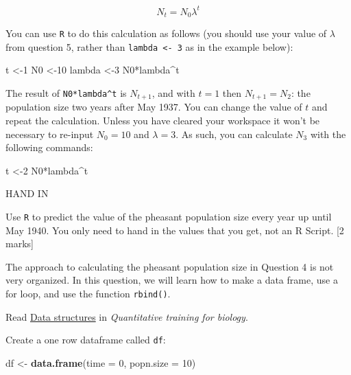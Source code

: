 \documentclass[]{book}
\newenvironment{Shaded}{\begin{snugshade}}{\end{snugshade}}
\newcommand{\KeywordTok}[1]{\textcolor[rgb]{0.13,0.29,0.53}{\textbf{{#1}}}}
\newcommand{\DataTypeTok}[1]{\textcolor[rgb]{0.13,0.29,0.53}{{#1}}}
\newcommand{\DecValTok}[1]{\textcolor[rgb]{0.00,0.00,0.81}{{#1}}}
\newcommand{\StringTok}[1]{\textcolor[rgb]{0.31,0.60,0.02}{{#1}}}
\newcommand{\NormalTok}[1]{{#1}}
\begin{document}
\[N_{t} = N_0 \lambda^t \]

You can use \texttt{R} to do this calculation as follows (you should use
your value of \(\lambda\) from question 5, rather than
\texttt{lambda\ \textless{}-\ 3} as in the example below):

\begin{Shaded}
\begin{Highlighting}[]
\NormalTok{t <-}\DecValTok{1}
\NormalTok{N0 <-}\DecValTok{10}
\NormalTok{lambda <-}\DecValTok{3}
\NormalTok{N0*lambda^t}
\end{Highlighting}
\end{Shaded}

The result of \texttt{N0*lambda\^{}t} is \(N_{t+1}\), and with \(t=1\)
then \(N_{t+1}=N_2\): the population size two years after May 1937. You
can change the value of \(t\) and repeat the calculation. Unless you
have cleared your workspace it won't be necessary to re-input
\(N_0 = 10\) and \(\lambda = 3\). As such, you can calculate \(N_3\)
with the following commands:

\begin{Shaded}
\begin{Highlighting}[]
\NormalTok{t <-}\DecValTok{2}
\NormalTok{N0*lambda^t}
\end{Highlighting}
\end{Shaded}

 HAND IN

Use \texttt{R} to predict the value of the pheasant population size
every year up until May 1940. You only need to hand in the values that
you get, not an R Script. {[}2 marks{]}

The approach to calculating the pheasant population size in Question 4
is not very organized. In this question, we will learn how to make a
data frame, use a for loop, and use the function \texttt{rbind()}.

Read
\href{https://ahurford.github.io/quantitative-training-guide/rintro.html\#data-structures}{Data
structures} in \emph{Quantitative training for biology}.

Create a one row dataframe called \texttt{df}:

\begin{Shaded}
\begin{Highlighting}[]
\NormalTok{df <-}\StringTok{ }\KeywordTok{data.frame}\NormalTok{(}\DataTypeTok{time =} \DecValTok{0}\NormalTok{, }\DataTypeTok{popn.size =} \DecValTok{10}\NormalTok{)}
\end{Highlighting}
\end{Shaded}
\end{document}

